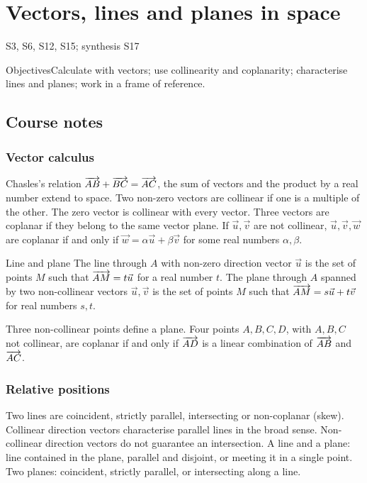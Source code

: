 \setcounter{chapter}{9}\chapter{Vectors, lines and planes in space}\label{ch:10}

{\small\sffamily\color{teal}S3, S6, S12, S15; synthesis S17\par}

\begin{retenir}{Objectives}Calculate with vectors; use collinearity and coplanarity; characterise lines and planes; work in a frame of reference.\end{retenir}

\section{Course notes}
\subsection{Vector calculus}
Chasles's relation $\overrightarrow{AB}+\overrightarrow{BC}=\overrightarrow{AC}$, the sum of vectors and the product by a real number extend to space. Two non-zero vectors are collinear if one is a multiple of the other. The zero vector is collinear with every vector.
Three vectors are coplanar if they belong to the same vector plane. If $\vec u,\vec v$ are not collinear, $\vec u,\vec v,\vec w$ are coplanar if and only if $\vec w=\alpha\vec u+\beta\vec v$ for some real numbers $\alpha,\beta$.
\begin{retenir}{Line and plane}
The line through $A$ with non-zero direction vector $\vec u$ is the set of points $M$ such that $\overrightarrow{AM}=t\vec u$ for a real number $t$.
The plane through $A$ spanned by two non-collinear vectors $\vec u,\vec v$ is the set of points $M$ such that $\overrightarrow{AM}=s\vec u+t\vec v$ for real numbers $s,t$.
\end{retenir}
Three non-collinear points define a plane. Four points $A,B,C,D$, with $A,B,C$ not collinear, are coplanar if and only if $\overrightarrow{AD}$ is a linear combination of $\overrightarrow{AB}$ and $\overrightarrow{AC}$.
\subsection{Relative positions}
Two lines are coincident, strictly parallel, intersecting or non-coplanar (skew). Collinear direction vectors characterise parallel lines in the broad sense. Non-collinear direction vectors do not guarantee an intersection.
A line and a plane: line contained in the plane, parallel and disjoint, or meeting it in a single point. Two planes: coincident, strictly parallel, or intersecting along a line.
